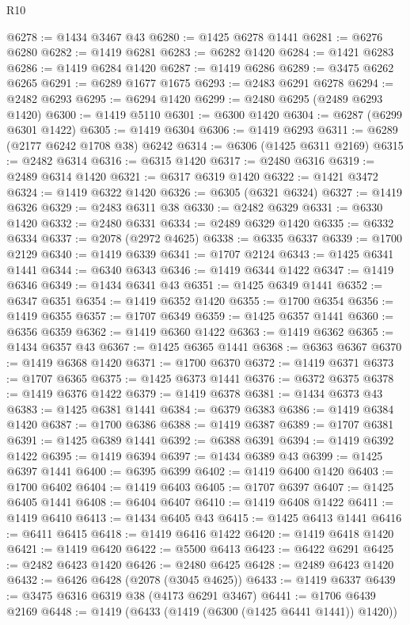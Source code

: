 \begin{lexlean}{R10}
\begin{coremodule}
@6278 := @1434 @3467 @43
@6280 := @1425 @6278 @1441
@6281 := @6276 @6280
@6282 := @1419 @6281
@6283 := @6282 @1420
@6284 := @1421 @6283
@6286 := @1419 @6284 @1420
@6287 := @1419 @6286
@6289 := @3475 @6262 @6265
@6291 := @6289 @1677 @1675
@6293 := @2483 @6291 @6278
@6294 := @2482 @6293
@6295 := @6294 @1420
@6299 := @2480 @6295 (@2489 @6293 @1420)
@6300 := @1419 @5110
@6301 := @6300 @1420
@6304 := @6287 (@6299 @6301 @1422)
@6305 := @1419 @6304
@6306 := @1419 @6293
@6311 := @6289 (@2177 @6242 @1708 @38) @6242
@6314 := @6306 (@1425 @6311 @2169)
@6315 := @2482 @6314
@6316 := @6315 @1420
@6317 := @2480 @6316
@6319 := @2489 @6314 @1420
@6321 := @6317 @6319 @1420
@6322 := @1421 @3472
@6324 := @1419 @6322 @1420
@6326 := @6305 (@6321 @6324)
@6327 := @1419 @6326
@6329 := @2483 @6311 @38
@6330 := @2482 @6329
@6331 := @6330 @1420
@6332 := @2480 @6331
@6334 := @2489 @6329 @1420
@6335 := @6332 @6334
@6337 := @2078 (@2972 @4625)
@6338 := @6335 @6337
@6339 := @1700 @2129
@6340 := @1419 @6339
@6341 := @1707 @2124
@6343 := @1425 @6341 @1441
@6344 := @6340 @6343
@6346 := @1419 @6344 @1422
@6347 := @1419 @6346
@6349 := @1434 @6341 @43
@6351 := @1425 @6349 @1441
@6352 := @6347 @6351
@6354 := @1419 @6352 @1420
@6355 := @1700 @6354
@6356 := @1419 @6355
@6357 := @1707 @6349
@6359 := @1425 @6357 @1441
@6360 := @6356 @6359
@6362 := @1419 @6360 @1422
@6363 := @1419 @6362
@6365 := @1434 @6357 @43
@6367 := @1425 @6365 @1441
@6368 := @6363 @6367
@6370 := @1419 @6368 @1420
@6371 := @1700 @6370
@6372 := @1419 @6371
@6373 := @1707 @6365
@6375 := @1425 @6373 @1441
@6376 := @6372 @6375
@6378 := @1419 @6376 @1422
@6379 := @1419 @6378
@6381 := @1434 @6373 @43
@6383 := @1425 @6381 @1441
@6384 := @6379 @6383
@6386 := @1419 @6384 @1420
@6387 := @1700 @6386
@6388 := @1419 @6387
@6389 := @1707 @6381
@6391 := @1425 @6389 @1441
@6392 := @6388 @6391
@6394 := @1419 @6392 @1422
@6395 := @1419 @6394
@6397 := @1434 @6389 @43
@6399 := @1425 @6397 @1441
@6400 := @6395 @6399
@6402 := @1419 @6400 @1420
@6403 := @1700 @6402
@6404 := @1419 @6403
@6405 := @1707 @6397
@6407 := @1425 @6405 @1441
@6408 := @6404 @6407
@6410 := @1419 @6408 @1422
@6411 := @1419 @6410
@6413 := @1434 @6405 @43
@6415 := @1425 @6413 @1441
@6416 := @6411 @6415
@6418 := @1419 @6416 @1422
@6420 := @1419 @6418 @1420
@6421 := @1419 @6420
@6422 := @5500 @6413
@6423 := @6422 @6291
@6425 := @2482 @6423 @1420
@6426 := @2480 @6425
@6428 := @2489 @6423 @1420
@6432 := @6426 @6428 (@2078 (@3045 @4625))
@6433 := @1419 @6337
@6439 := @3475 @6316 @6319 @38 (@4173 @6291 @3467)
@6441 := @1706 @6439 @2169
@6448 := @1419 (@6433 (@1419 (@6300 (@1425 @6441 @1441)) @1420))

\end{coremodule}
\end{lexlean}
